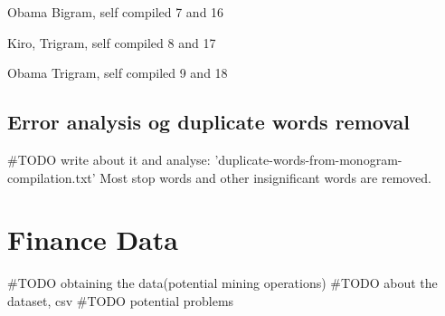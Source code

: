 Obama Bigram, self compiled
7 and 16

Kiro, Trigram, self compiled
8 and 17

Obama Trigram, self compiled
9 and 18
%

\subsection{Error analysis og duplicate words removal}
#TODO write about it and analyse:
'duplicate-words-from-monogram-compilation.txt'
Most stop words and other insignificant words are removed. 
%

\section{Finance Data}\label{data:finance}
#TODO obtaining the data(potential mining operations)
#TODO about the dataset, csv
#TODO potential problems 
%

